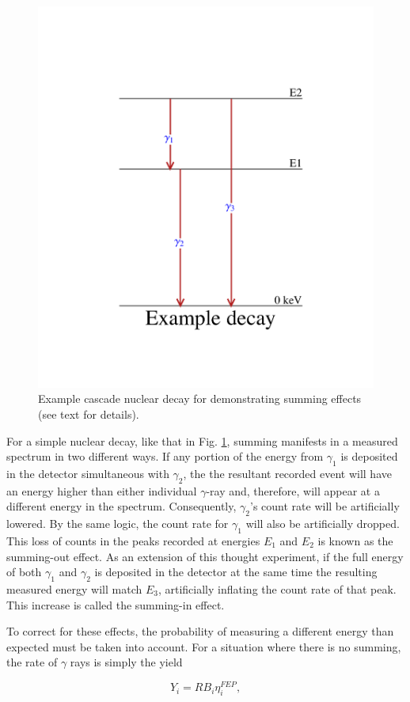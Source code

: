 \begin{figure}
\centering
\includegraphics[width=0.7\linewidth]{figures/simpleScheme.pdf}
\caption{Example cascade nuclear decay for demonstrating summing effects (see text for details). }
\label{fig: simpleDecay}
\end{figure}

For a simple nuclear decay, like that in Fig. \ref{fig: simpleDecay}, summing manifests in a measured spectrum in two different ways. If any portion of the energy from $\gamma_{1}$ is deposited in the detector simultaneous with $\gamma_{2}$, the the resultant recorded event will have an energy higher than either individual $\gamma$-ray and, therefore, will appear at a different energy in the spectrum. Consequently, $\gamma_{2}$'s count rate will be artificially lowered. By the same logic, the count rate for $\gamma_{1}$ will also be artificially dropped. This loss of counts in the peaks recorded at energies $E_{1}$ and $E_{2}$ is known as the summing-out effect. As an extension of this thought experiment, if the full energy of both $\gamma_{1}$ and $\gamma_{2}$ is deposited in the detector at the same time the resulting measured energy will match $E_{3}$, artificially inflating the count rate of that peak. This increase is called the summing-in effect.

To correct for these effects, the probability of measuring a different energy than expected must be taken into account. For a situation where there is no summing, the rate of $\gamma$ rays is simply the yield

\begin{equation}
Y_{i} = R B_{i} \eta^{FEP}_{i},
\end{equation}

